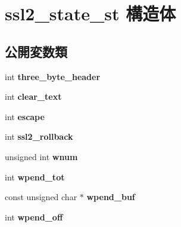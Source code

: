 \hypertarget{structssl2__state__st}{}\section{ssl2\+\_\+state\+\_\+st 構造体}
\label{structssl2__state__st}
\subsection*{公開変数類}
\begin{DoxyCompactItemize}
\item 
\hypertarget{structssl2__state__st_a65dd8015e198ff0042ac720ed7aaf349}{}int {\bfseries three\+\_\+byte\+\_\+header}\label{structssl2__state__st_a65dd8015e198ff0042ac720ed7aaf349}

\item 
\hypertarget{structssl2__state__st_ababb069796570023851a5b43a79e18fd}{}int {\bfseries clear\+\_\+text}\label{structssl2__state__st_ababb069796570023851a5b43a79e18fd}

\item 
\hypertarget{structssl2__state__st_a222f404603c3d628201053adf8777cf7}{}int {\bfseries escape}\label{structssl2__state__st_a222f404603c3d628201053adf8777cf7}

\item 
\hypertarget{structssl2__state__st_a4f412c07d8413d68b6c876c606924001}{}int {\bfseries ssl2\+\_\+rollback}\label{structssl2__state__st_a4f412c07d8413d68b6c876c606924001}

\item 
\hypertarget{structssl2__state__st_ae33bd4e0b04e70d85f982b978b4d1be6}{}unsigned int {\bfseries wnum}\label{structssl2__state__st_ae33bd4e0b04e70d85f982b978b4d1be6}

\item 
\hypertarget{structssl2__state__st_ac50b123c8bdeb713b84a0e479f4d1eb5}{}int {\bfseries wpend\+\_\+tot}\label{structssl2__state__st_ac50b123c8bdeb713b84a0e479f4d1eb5}

\item 
\hypertarget{structssl2__state__st_a887ba9e86d2c926a8af93e818455fcfd}{}const unsigned char $\ast$ {\bfseries wpend\+\_\+buf}\label{structssl2__state__st_a887ba9e86d2c926a8af93e818455fcfd}

\item 
\hypertarget{structssl2__state__st_ad01fd1f61618a671614ade83346d594b}{}int {\bfseries wpend\+\_\+off}\label{structssl2__state__st_ad01fd1f61618a671614ade83346d594b}


\end{DoxyCompactItemize}
